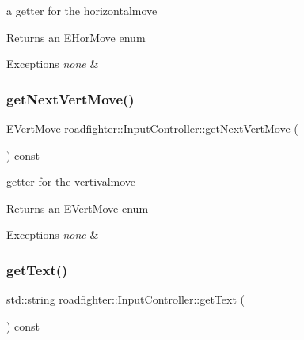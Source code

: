 a getter for the horizontalmove \begin{DoxyReturn}{Returns}
an E\+Hor\+Move enum 
\end{DoxyReturn}

\begin{DoxyExceptions}{Exceptions}
{\em none} & \\
\hline
\end{DoxyExceptions}
\mbox{\label{classroadfighter_1_1InputController_a345eeddef99bff95e238f9dd822daf77}} 
\subsubsection{\texorpdfstring{get\+Next\+Vert\+Move()}{getNextVertMove()}}
{\footnotesize\ttfamily E\+Vert\+Move roadfighter\+::\+Input\+Controller\+::get\+Next\+Vert\+Move (\begin{DoxyParamCaption}{ }\end{DoxyParamCaption}) const}

getter for the vertivalmove \begin{DoxyReturn}{Returns}
an E\+Vert\+Move enum 
\end{DoxyReturn}

\begin{DoxyExceptions}{Exceptions}
{\em none} & \\
\hline
\end{DoxyExceptions}
\mbox{\label{classroadfighter_1_1InputController_ae8e47099a39fd61e18cdd89b34fb5d5c}} 
\subsubsection{\texorpdfstring{get\+Text()}{getText()}}
{\footnotesize\ttfamily std\+::string roadfighter\+::\+Input\+Controller\+::get\+Text (\begin{DoxyParamCaption}{ }\end{DoxyParamCaption}) const}

